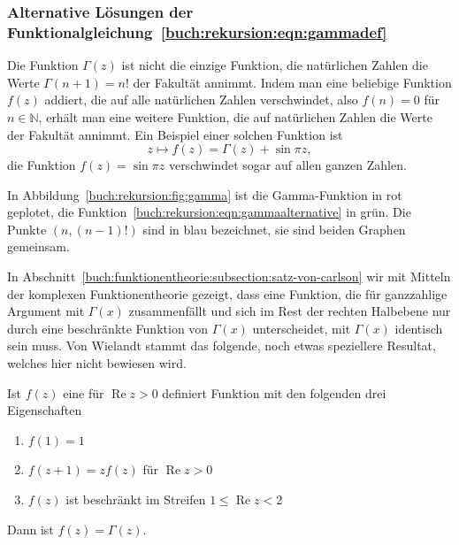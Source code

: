 %
%
\subsubsection{Alternative Lösungen der
Funktionalgleichung~\ref{buch:rekursion:eqn:gammadef}}
Die Funktion $\Gamma(z)$ ist nicht die einzige Funktion, die natürlichen
Zahlen die Werte $\Gamma(n+1) = n!$ der Fakultät annimmt.
Indem man eine beliebige Funktion $f(z)$ addiert, die auf alle
natürlichen Zahlen verschwindet, also $f(n)=0$ für $n\in\mathbb{N}$,
erhält man eine weitere Funktion, die auf natürlichen Zahlen
die Werte der Fakultät annimmt.
Ein Beispiel einer solchen Funktion ist
\begin{equation}
z\mapsto f(z)=\Gamma(z) + \sin \pi z,
\label{buch:rekursion:eqn:gammaalternative}
\end{equation}
die Funktion $f(z)=\sin\pi z$ verschwindet sogar auf allen ganzen
Zahlen.

In Abbildung~\ref{buch:rekursion:fig:gamma} ist die Gamma-Funktion
in rot geplotet, die Funktion~\eqref{buch:rekursion:eqn:gammaalternative}
in grün.
Die Punkte $(n,(n-1)!)$ sind in blau bezeichnet, sie sind beiden Graphen
gemeinsam.

In Abschnitt~\ref{buch:funktionentheorie:subsection:satz-von-carlson}
wir mit Mitteln der komplexen Funktionentheorie gezeigt, dass eine
Funktion, die für ganzzahlige Argument mit $\Gamma(x)$ zusammenfällt
und sich im Rest der rechten Halbebene nur durch eine beschränkte
Funktion von $\Gamma(x)$ unterscheidet, mit $\Gamma(x)$
identisch sein muss.
Von Wielandt stammt das folgende, noch etwas speziellere Resultat,
welches hier nicht bewiesen wird.

\begin{satz}[Wielandt]
%
%
Ist $f(z)$ eine für $\operatorname{Re}z>0$ definiert Funktion mit
den folgenden drei Eigenschaften
\begin{enumerate}
\item $f(1)=1$
\item $f(z+1)=zf(z)$ für $\operatorname{Re}z>0$
\item $f(z)$ ist beschränkt im Streifen $1\le \operatorname{Re}z< 2$
\end{enumerate}
Dann ist $ f(z) = \Gamma(z) $.
\end{satz}


%
%
